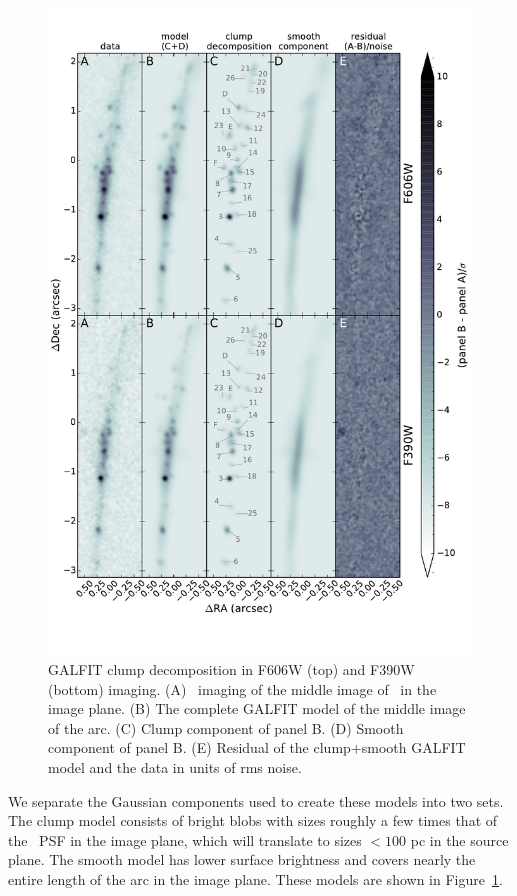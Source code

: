 \begin{figure}
\center
\includegraphics[scale=0.7,resolution=300,trim=0 50 0 50]{Chap4/c4f9.pdf}
\caption[GALFIT decomposition of \giantarc]{GALFIT clump decomposition in F606W (top) and F390W (bottom) imaging. (A) \hst\ imaging of the middle image of \giantarc\ in the image plane. (B) The complete GALFIT model of the middle image of the arc. (C) Clump component of panel B. (D) Smooth component of panel B. (E) Residual of the clump+smooth GALFIT model and the data in units of rms noise.}
\label{chap4:fig:galfit_model}
\end{figure}

We separate the Gaussian components used to create these models into two sets. The clump model consists of bright blobs with sizes roughly a few times that of the \hst\ PSF in the image plane, which will translate to sizes $<100$ pc in the source plane. The smooth model has lower surface brightness and covers nearly the entire length of the arc in the image plane. These models are shown in Figure~\ref{chap4:fig:galfit_model}.

